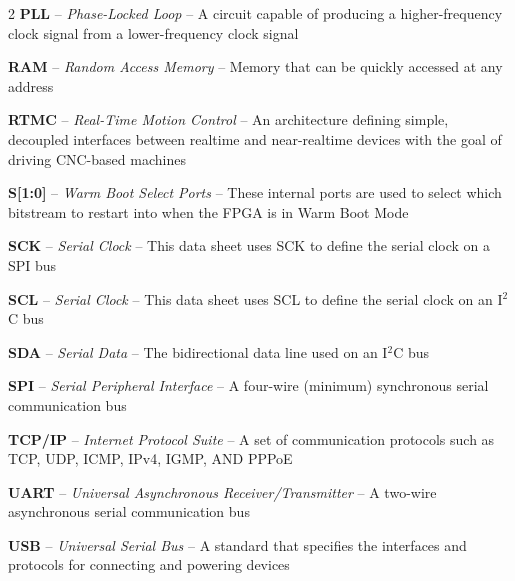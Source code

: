 \begin{multicols}{2}
    \textbf{PLL} -- \textit{Phase-Locked Loop} -- A circuit capable of producing a higher-frequency clock signal from a lower-frequency clock signal

    \textbf{RAM} -- \textit{Random Access Memory} -- Memory that can be quickly accessed at any address

    \textbf{RTMC} -- \textit{Real-Time Motion Control} -- An architecture defining simple, decoupled interfaces between realtime and near-realtime devices with the goal of driving CNC-based machines

    \textbf{S[1:0]} -- \textit{Warm Boot Select Ports} -- These internal ports are used to select which bitstream to restart into when the FPGA is in Warm Boot Mode

    \textbf{SCK} -- \textit{Serial Clock} -- This data sheet uses SCK to define the serial clock on a SPI bus

    \textbf{SCL} -- \textit{Serial Clock} -- This data sheet uses SCL to define the serial clock on an I$^2$C bus

    \textbf{SDA} -- \textit{Serial Data} -- The bidirectional data line used on an I$^2$C bus

    \textbf{SPI} -- \textit{Serial Peripheral Interface} -- A four-wire (minimum) synchronous serial communication bus

    \textbf{TCP/IP} -- \textit{Internet Protocol Suite} -- A set of communication protocols such as TCP, UDP, ICMP, IPv4, IGMP, AND PPPoE
    
    \textbf{UART} -- \textit{Universal Asynchronous Receiver/Transmitter} -- A two-wire asynchronous serial communication bus

    \textbf{USB} -- \textit{Universal Serial Bus} -- A standard that specifies the interfaces and protocols for connecting and powering devices
    
    \newpage
\end{multicols}
